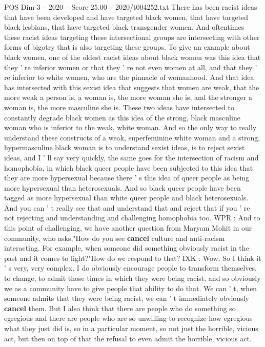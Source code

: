 \begin{textsample}{POS Dim 3 – 2020 – Score 25.00 – 2020/t004252.txt}
There has been racist ideas that have been developed and have targeted black women, that have targeted black lesbians, that have targeted black transgender women.
And oftentimes these racist ideas targeting these intersectional groups are intersecting with other forms of bigotry that is also targeting these groups.
To give an example about black women, one of the oldest racist ideas about black women was this idea that they ' re inferior women or that they ' re not even women at all, and that they ' re inferior to white women, who are the pinnacle of womanhood.
And that idea has intersected with this sexist idea that suggests that women are weak, that the more weak a person is, a woman is, the more woman she is, and the stronger a woman is, the more masculine she is.
These two ideas have intersected to constantly degrade black women as this idea of the strong, black masculine woman who is inferior to the weak, white woman.
And so the only way to really understand these constructs of a weak, superfeminine white woman and a strong, hypermasculine black woman is to understand sexist ideas, is to reject sexist ideas, and I ' ll say very quickly, the same goes for the intersection of racism and homophobia, in which black queer people have been subjected to this idea that they are more hypersexual because there ' s this idea of queer people as being more hypersexual than heterosexuals.
And so black queer people have been tagged as more hypersexual than white queer people and black heterosexuals.
And you can ' t really see that and understand that and reject that if you ' re not rejecting and understanding and challenging homophobia too.
WPR : And to this point of challenging, we have another question from Maryam Mohit in our community, who asks,"How do you see \textbf{cancel} culture and anti-racism interacting.
For example, when someone did something obviously racist in the past and it comes to light?"How do we respond to that?
IXK : Wow.
So I think it ' s very, very complex.
I do obviously encourage people to transform themselves, to change, to admit those times in which they were being racist, and so obviously we as a community have to give people that ability to do that.
We can ' t, when someone admits that they were being racist, we can ' t immediately obviously \textbf{cancel} them.
But I also think that there are people who do something so egregious and there are people who are so unwilling to recognize how egregious what they just did is, so in a particular moment, so not just the horrible, vicious act, but then on top of that the refusal to even admit the horrible, vicious act.

\end{textsample}
